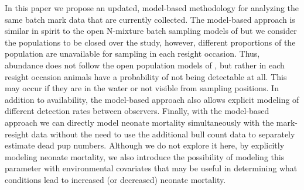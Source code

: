 \documentclass[fleqn,10pt]{wlscirep}
\begin{document}
In this paper we propose an updated, model-based methodology for analyzing the same batch mark data that are currently collected. The model-based approach is similar in spirit to the open N-mixture batch sampling models of \cite{cowen2017hidden} but we consider the populations to be closed over the study, however, different proportions of the population are unavailable for sampling in each resight occasion. Thus, abundance does not follow the open population models of \cite{dail2011models}, but rather in each resight occasion animals have a probability of not being detectable at all. This may occur if they are in the water or not visible from sampling positions. In addition to availability, the model-based approach also allows explicit modeling of different detection rates between observers. Finally, with the model-based approach we can directly model neonate mortality simultaneously with the mark-resight data without the need to use the additional bull count data to separately estimate dead pup numbers. Although we do not explore it here, by explicitly modeling neonate mortality, we also introduce the possibility of modeling this parameter with environmental covariates that may be useful in determining what conditions lead to increased (or decreased) neonate mortality.
\end{document}

